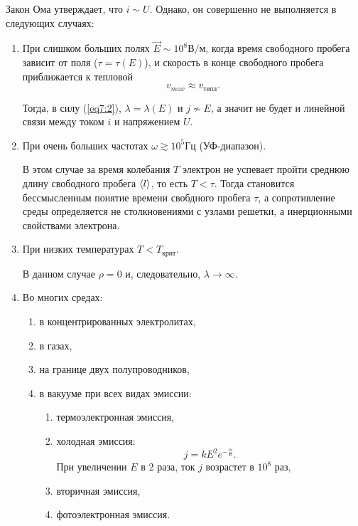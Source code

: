     Закон Ома утверждает, что \( i \sim U \). Однако, он совершенно не
    выполняется в следующих случаях:
    \begin{enumerate}
    \item При слишком больших полях \( \vec{E} \sim 10^8 \text{В}/\text{м} \),
        когда время свободного пробега зависит от поля (\( \tau = \tau(E) \)),
        и скорость в конце свободного пробега приближается к тепловой
        \[
            v_{\textit{max}} \approx v_{\textit{тепл}}.
        \]
            
        Тогда, в силу (\ref{eq7:2}), \( \lambda = \lambda(E) \) и
        \( j \nsim E \), а значит не будет и линейной связи между током \( i \)
        и напряжением \( U \).
    
    \item При очень больших частотах \( \omega \gtrsim 10^5 \text{Гц} \)
        (УФ-диапазон).
        
        В этом случае за время колебания \( T \) электрон не успевает пройти
        среднюю длину свободного пробега \( \langle l\rangle \), то есть
        \( T < \tau \). Тогда становится бессмысленным понятие времени свобдного
        пробега \( \tau \), а сопротивление среды определяется не столкновениями
        с узлами решетки, а инерционными свойствами электрона.
        
    \item При низких температурах \( T < T_{\textit{крит}} \).
        
        В данном случае \( \rho = 0 \) и, следовательно,
        \( \lambda \rightarrow \infty \).
    
    \item
        Во многих средах:
        \begin{enumerate}
        \item
            в концентрированных электролитах,
        \item
            в газах,
        \item
            на границе двух полупроводников,
        \item
            в вакууме при всех видах эмиссии:
            \begin{enumerate}
            \item
                термоэлектронная эмиссия,
            \item
                холодная эмиссия:
                \[
                    j = kE^2 e^{-\frac{\alpha}{E}}.
                \]
                При увеличении \( E \) в 2 раза, ток \( j \) возрастет в
                \( 10^8 \) раз,
            \item
                вторичная эмиссия,
            \item
                фотоэлектронная эмиссия.
            \end{enumerate}
        \end{enumerate}
    \end{enumerate}

